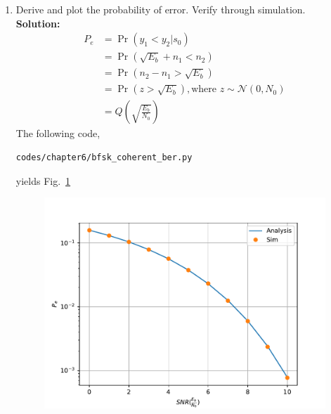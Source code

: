 \documentclass[journal,10pt,twocolumn]{IEEEtran}
\newcommand\figref{Fig.~\ref}
\providecommand{\pr}[1]{\ensuremath{\Pr\left(#1\right)}}
\providecommand{\qfunc}[1]{\ensuremath{Q\left(#1\right)}}
\newcommand{\solution}{\noindent \textbf{Solution: }}
\providecommand{\gauss}[2]{\mathcal{N}\ensuremath{\left(#1,#2\right)}}
\begin{document}
\begin{enumerate}
\item
Derive and plot the probability of error.  Verify through simulation.\\
\solution 
\begin{align}
	P_e &= \pr{y_1<y_2|s_0}\\
	&= \pr{\sqrt{E_b}+n_1<n_2}\\
	&= \pr{n_2-n_1 > \sqrt{E_b}}\\ \nonumber
	&= \pr{z > \sqrt{E_b}}, \text{where $z \sim \gauss{0}{N_0}$}\\
	&= \qfunc{\sqrt{\frac{E_b}{N_0}}}
\end{align}
The following code,
\begin{lstlisting}
codes/chapter6/bfsk_coherent_ber.py
\end{lstlisting}
yields \figref{fig:bfsk_coherent_ber}
\begin{figure}[H]
\centering
\includegraphics[width=\columnwidth]{./figs/chapter6/bfsk_coherent_ber.pdf}
\caption{}
\label{fig:bfsk_coherent_ber}
\end{figure}
\end{enumerate}

%
\end{document}
